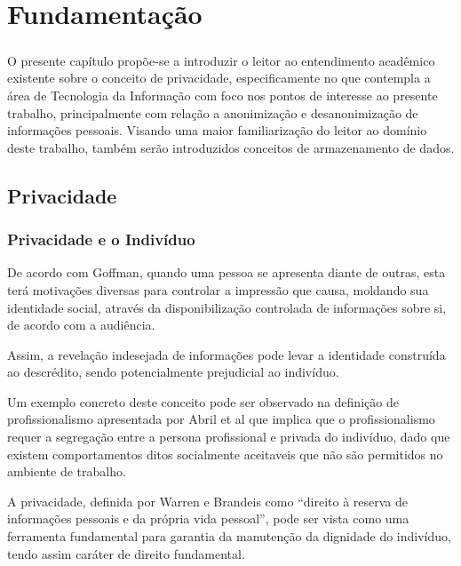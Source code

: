 \chapter{Fundamentação}
\label{cap2}

\paragraph{} O presente capítulo propõe-se a introduzir o leitor ao entendimento acadêmico existente sobre o conceito de privacidade, especificamente no que contempla a área de Tecnologia da Informação com foco nos pontos de interesse ao presente trabalho,
principalmente com relação a anonimização e desanonimização de informações pessoais. 
Visando uma maior familiarização do leitor ao domínio deste trabalho, também serão introduzidos conceitos de armazenamento de dados.

\section{Privacidade}

\subsection{Privacidade e o Indivíduo}

De acordo com Goffman\cite{goffman1978presentation}, quando uma pessoa se apresenta diante de outras, esta terá motivações diversas para controlar a impressão que causa, moldando sua identidade social, através da disponibilização controlada de informações sobre si, de acordo com a audiência. 

Assim, a revelação indesejada de informações pode levar a identidade construída ao descrédito, sendo potencialmente prejudicial ao indivíduo.

Um exemplo concreto deste conceito pode ser observado na definição de profissionalismo apresentada por Abril et al \cite{sanchez2012blurred} que implica que o profissionalismo requer a segregação entre a persona profissional e privada do indivíduo, dado que existem comportamentos ditos socialmente aceitaveis que não são permitidos no ambiente de trabalho.

A privacidade, definida por Warren e Brandeis como ``direito à reserva de informações pessoais e da própria vida pessoal''\cite{warren1890right}, pode ser vista como uma ferramenta fundamental para garantia da manutenção da dignidade do indivíduo, tendo assim caráter de direito fundamental.


